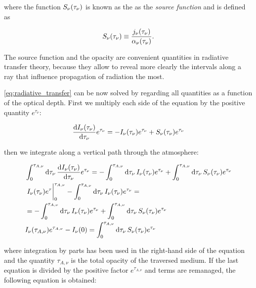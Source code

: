 where the function $S_\nu\qty(\tau_\nu)$ is known as the as the \emph{source
function} and is defined as

\begin{equation}
        S_\nu(\tau_\nu) \equiv
        \frac{j_\nu\qty(\tau_\nu)}{\alpha_\nu\qty(\tau_\nu)}.
\end{equation}

The source function and the opacity are convenient quantities in radiative
transfer theory, because they allow to reveal more clearly the intervals
along a ray that influence propagation of radiation the most.

\autoref{eq:radiative_transfer} can be now solved by regarding all
quantities as a function of the optical depth. First we multiply each side
of the equation by the positive quantity $e^{\tau_\nu}$:

\begin{equation}
        \dv{I_\nu\qty(\tau_\nu)}{\tau_\nu}e^{\tau_\nu} =
        -I_\nu\qty(\tau_\nu)e^{\tau_\nu} +
        S_\nu\qty(\tau_\nu)e^{\tau_\nu}
\end{equation}

then we integrate along a vertical path through the atmosphere:

\begin{equation}
        \begin{split}
                & \int^{\tau_{A,\nu}}_0 \dd{\tau_\nu}
                \dv{I_\nu\qty(\tau_\nu)}{\tau_\nu} e^{\tau_\nu} =
                -\int^{\tau_{A,\nu}}_0 \dd{\tau_\nu}
                I_\nu\qty(\tau_\nu) e^{\tau_\nu} +
                \int^{\tau_{A,\nu}}_0 \dd{\tau_\nu}
                S_\nu\qty(\tau_\nu) e^{\tau_\nu} \\
                & \eval{I_\nu\qty(\tau_\nu) e^\tau}^{\tau_{A,\nu}}_0
                -\int^{\tau_{A,\nu}}_0 \dd{\tau_\nu}
                I_\nu\qty(\tau_\nu) e^{\tau_\nu} = \\
                & = -\int^{\tau_{A,\nu}}_0 \dd{\tau_\nu}
                I_\nu\qty(\tau_\nu) e^{\tau_\nu} +
                \int^{\tau_{A,\nu}}_0 \dd{\tau_\nu}
                S_\nu\qty(\tau_\nu) e^{\tau_\nu} \\
                & I_\nu\qty(\tau_{A,\nu}) e^{\tau_{A,\nu}} -I_\nu\qty(0) =
                \int^{\tau_{A,\nu}}_0 \dd{\tau_\nu}
                S_\nu\qty(\tau_\nu) e^{\tau_\nu}
        \end{split}
\end{equation}

where integration by parts has been used in the right-hand side of the
equation and the quantity $\tau_{A,\nu}$ is the total opacity of the
traversed medium. If the last equation is divided by the positive factor
$e^{\tau_{A,\nu}}$ and terms are remanaged, the following equation is
obtained:

